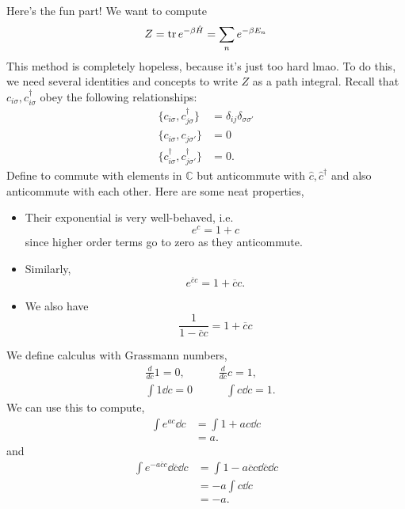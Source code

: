 \documentclass{article}
\numberwithin{equation}{section}
\begin{document}
    Here's the fun part! We want to compute 
    \begin{equation}
        Z = \tr e^{-\beta \hat{H}} = \sum_n e^{-\beta E_n}
    \end{equation}
    This method is completely hopeless, because it's just too hard lmao. To do this, we need several identities and concepts to write $Z$ as a path integral. Recall that $c_{i\sigma}, c_{i\sigma}^\dagger$ obey the following relationships:
    \begin{align}
        \{c_{i\sigma}, c_{j\sigma}^\dagger\} &= \delta_{ij}\delta_{\sigma\sigma'} \\
        \{c_{i\sigma}, c_{j\sigma'}\} &= 0 \\ 
        \{c_{i\sigma}^\dagger, c_{j\sigma'}^\dagger\} &= 0.
    \end{align}
    Define  to commute with elements in $\mathbb{C}$ but anticommute with $\hat{c},\hat{c}^\dagger$ and also anticommute with each other. Here are some neat properties,
    \begin{itemize}
        \item Their exponential is very well-behaved, i.e. 
        \begin{equation}
            e^c = 1+c
        \end{equation}
        since higher order terms go to zero as they anticommute.
        \item Similarly,
        \begin{equation}
            e^{\overline{c}c} = 1 + \overline{c}c.
        \end{equation}
        \item We also have 
        \begin{equation}
            \frac{1}{1-\overline{c}c} = 1+ \overline{c}c
        \end{equation}
    \end{itemize}
    We define calculus with Grassmann numbers,
    \begin{align}
        &\frac{d}{dc}1=0,\quad\quad\quad \frac{d}{dc}c=1,\\ 
        &\int 1 \dd{c} = 0\quad\quad\quad \int c \dd{c} = 1.
    \end{align}
    We can use this to compute,
    \begin{align}
        \int e^{ac} \dd{c} &= \int 1 + ac \dd{c}  \\ 
        &= a.
    \end{align}
    and 
    \begin{align}
        \int e^{-a\overline{c}c}\dd{\overline{c}}\dd{c} &= \int 1 - a\overline{c}c \dd{\overline{c}}\dd{c} \\
        &= -a\int c \dd{c} \\ 
        &= -a.
    \end{align}
\end{document}
